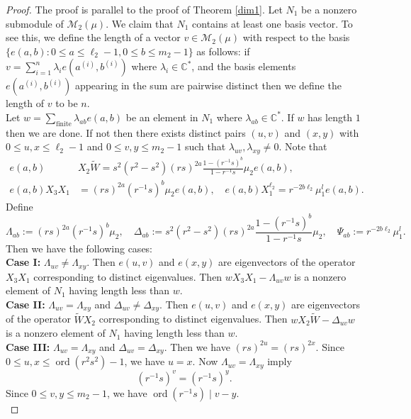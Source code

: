 \documentclass[12 pt,reqno]{amsart}
\numberwithin{equation}{section}
\DeclareMathOperator{\ord}{ord}
\theoremstyle{definition}
\theoremstyle{definition}
\theoremstyle{remark}
\theoremstyle{remark}
\begin{document}
\begin{proof}
    The proof is parallel to the proof of Theorem \ref{dim1}. Let $N_1$ be a nonzero submodule of $\mathcal{M}_2(\mu)$. We claim that $N_1$ contains at least one basis vector. To see this, we define the length of a vector $v \in \mathcal{M}_2(\mu)$ with respect to the basis $\{e(a,b): 0 \leq a \leq \ell_2-1, 0 \leq b \leq m_2-1\}$ as follows: if $v=\sum_{i=1}^{n}\lambda_{i}e(a^{(i)},b^{(i)})$ where $\lambda_i \in \mathbb{C}^*$, and the basis elements $e(a^{(i)},b^{(i)})$ appearing in the sum are pairwise distinct then we define the length of $v$ to be $n$.\\
    Let $w=\sum_{\text{finite}}\lambda_{ab}e(a,b)$ be an element in $N_1$ where $\lambda_{ab} \in \mathbb{C}^*$. If $w$ has length $1$ then we are done. If not then there exists distinct pairs $(u,v)$ and $(x,y)$ with $0 \leq u,x \leq \ell_2-1$ and $0 \leq v,y \leq m_2-1$ such that $\lambda_{uv},\lambda_{xy} \neq 0$.
    Note that 
    \begin{align*}
      e(a,b)&X_2\tilde{W}=s^2(r^2-s^2)(rs)^{2a}\displaystyle\frac{1-(r^{-1}s)^b}{1-r^{-1}s}\mu_2e(a,b), \\
        e(a,b)X_3X_1&=(rs)^{2a}(r^{-1}s)^b \mu_2 e(a,b),  \quad e(a,b)X_1^{\ell_2}=r^{-2b\ell_2}\mu_1^le(a,b).
    \end{align*}
    Define \[\Lambda_{ab}:=(rs)^{2a}(r^{-1}s)^b \mu_2,\quad \Delta_{ab}:=s^2(r^2-s^2)(rs)^{2a}\displaystyle\frac{1-(r^{-1}s)^b}{1-r^{-1}s}\mu_2,\quad \Psi_{ab}:=r^{-2b\ell_2}\mu_1^l.\] Then we have the following cases:\\
    \textbf{Case I:} $\Lambda_{uv} \neq \Lambda_{xy}$. Then $e(u,v)$ and $e(x,y)$ are eigenvectors of the operator $X_3X_1$ corresponding to distinct eigenvalues. Then $wX_3X_1-\Lambda_{uv}w$ is a nonzero element of $N_1$ having length less than $w$.\\
    \textbf{Case II:} $\Lambda_{uv} = \Lambda_{xy}$ and $\Delta_{uv}\neq\Delta_{xy}$. Then $e(u,v)$ and $e(x,y)$ are eigenvectors of the operator $\tilde{W}X_2$ corresponding to distinct eigenvalues. Then $wX_2\tilde{W}-\Delta_{uv}w$ is a nonzero element of $N_1$ having length less than $w$.\\
    \textbf{Case III:} $\Lambda_{uv} = \Lambda_{xy}$ and $\Delta_{uv}=\Delta_{xy}$. Then we have  $(rs)^{2u}=(rs)^{2x}$. Since $0 \leq u,x \leq \ord(r^2s^2)-1$, we have $u=x$.
     Now $\Lambda_{uv} = \Lambda_{xy}$ imply 
     \begin{equation}\label{e2}
        (r^{-1}s)^v=(r^{-1}s)^y. 
     \end{equation} Since $0 \leq v,y \leq m_2-1$, we have $\ord(r^{-1}s)\mid v-y$.\\

\end{proof}
\end{document}
